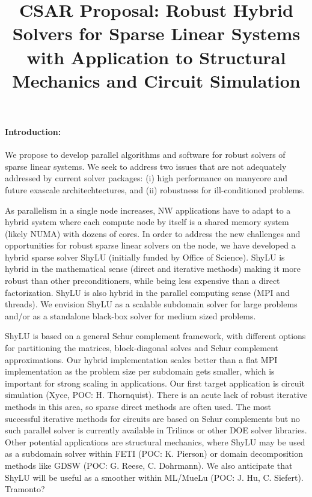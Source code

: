 \documentclass[10pt]{amsart}
\date{}
\title{CSAR Proposal: Robust Hybrid Solvers for Sparse Linear Systems with Application to Structural Mechanics and Circuit Simulation}
\begin{document}
\maketitle

\paragraph{\bf Introduction:}
We propose to develop parallel algorithms and software for robust solvers
of sparse linear systems. We seek to address two issues that
are not adequately addressed by current solver packages:
(i) high performance on manycore and future exascale architechtectures, and
(ii) robustness for ill-conditioned problems.

As parallelism in a single node increases, NW applications
have to adapt to a hybrid system where each compute node by itself
is a shared memory system (likely NUMA) with dozens of cores. 
In order to address the new challenges and opportunities 
for robust sparse linear solvers on the node,
we have developed a hybrid sparse solver ShyLU (initially funded by 
Office of Science). ShyLU is hybrid in the
mathematical sense (direct and iterative methods) making it more
robust than other preconditioners, while being less expensive
than a direct factorization.  ShyLU is also hybrid in the parallel
computing sense (MPI and threads). We envision ShyLU as a scalable
subdomain solver for large problems and/or as a standalone black-box solver
for medium sized problems.

ShyLU is based on a general Schur complement framework, with different options
for partitioning the matrices, block-diagonal solves and Schur complement
approximations.  Our hybrid implementation scales better than
a flat MPI implementation as the problem size per subdomain gets smaller, 
which is important for strong scaling in applications.
Our first target application is circuit simulation (Xyce, POC: H. Thornquist). 
There is an acute lack of robust iterative methods in this area, so sparse
direct methods are often used. The most successful iterative methods
for circuits are based on Schur complements but no such parallel solver
is currently available in Trilinos or other DOE solver libraries.
%
Other potential applications are structural mechanics, where ShyLU
may be used as a subdomain solver within FETI (POC: K. Pierson) or
domain decomposition methods like GDSW (POC: G. Reese, C. Dohrmann). 
We also anticipate that ShyLU
will be useful as a smoother within ML/MueLu (POC: J. Hu, C. Siefert).
Tramonto?
\end{document}
